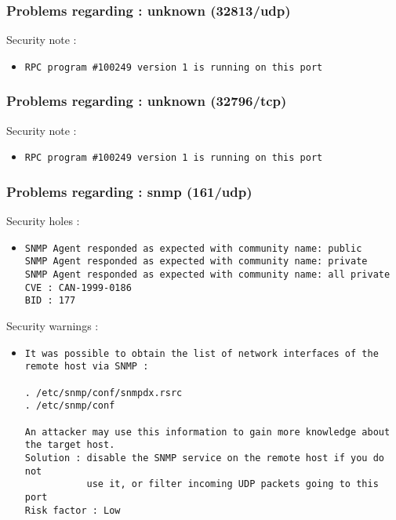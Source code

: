 \documentclass{article}
\begin{document}
\subsubsection{Problems regarding : unknown (32813/udp)}
Security note :\\
\begin{itemize}
\item \begin{verbatim}
RPC program #100249 version 1 is running on this port
\end{verbatim}\end{itemize}
\subsubsection{Problems regarding : unknown (32796/tcp)}
Security note :\\
\begin{itemize}
\item \begin{verbatim}
RPC program #100249 version 1 is running on this port
\end{verbatim}\end{itemize}
\subsubsection{Problems regarding : snmp (161/udp)}
Security holes :\\
\begin{itemize}
\item \begin{verbatim}
SNMP Agent responded as expected with community name: public
SNMP Agent responded as expected with community name: private
SNMP Agent responded as expected with community name: all private
CVE : CAN-1999-0186
BID : 177
\end{verbatim}\end{itemize}
Security warnings :\\
\begin{itemize}
\item \begin{verbatim}
It was possible to obtain the list of network interfaces of the
remote host via SNMP : 

. /etc/snmp/conf/snmpdx.rsrc
. /etc/snmp/conf

An attacker may use this information to gain more knowledge about
the target host.
Solution : disable the SNMP service on the remote host if you do not
           use it, or filter incoming UDP packets going to this port
Risk factor : Low
\end{verbatim}\end{itemize}
\end{document}
